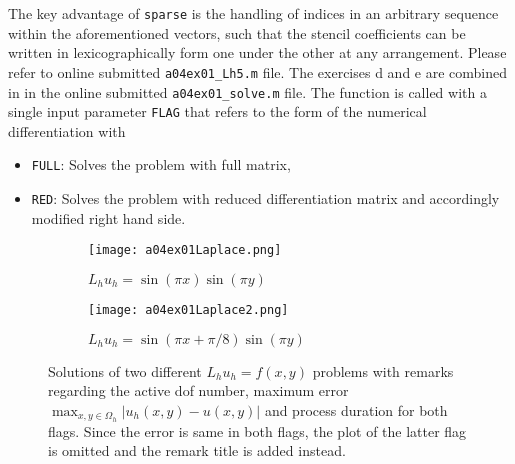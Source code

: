 The key advantage of \texttt{sparse} is the handling of indices in an arbitrary sequence within the aforementioned vectors, such that the stencil coefficients can be written in lexicographically form one under the other at any arrangement.
%
Please refer to online submitted \texttt{a04ex01\_Lh5.m} file.
%
The exercises d and e are combined in in the online submitted \texttt{a04ex01\_solve.m} file.
The function is called with a single input parameter \texttt{FLAG} that refers to the form of the numerical differentiation with
\begin{itemize}
	\item \texttt{FULL}: Solves the problem with full matrix,
	\item \texttt{RED}: Solves the problem with reduced differentiation matrix and accordingly modified right hand side.
\end{itemize}

\begin{figure}[p]
\vspace*{\FigUpperVSpace}
	\begin{subfigure}[t]{0.9\hsize}
		\centering
		\texttt{[image: a04ex01Laplace.png]} 
		\caption{$L_h u_h = \sin{(\pi x)} \sin{(\pi y)} $}
		\label{fig:a04ex01Laplace1}
		\vspace*{8mm}
	\end{subfigure}
\par\bigskip %
	\begin{subfigure}[b]{0.9\hsize}
		\centering
		\texttt{[image: a04ex01Laplace2.png]} 
		\caption{$L_h u_h = \sin{(\pi x + \pi/8)} \sin{(\pi y)} $}
		\label{fig:a04ex01Laplace2}
		\vspace*{5mm}
	\end{subfigure}
	\caption{Solutions of two different $L_h u_h = f(x,y)$ problems with remarks regarding the active dof number, maximum error $\max_{x,y \in \Omega_h} |u_h (x,y) - u(x,y)|$ and process duration for both flags. Since the error is same in both flags, the plot of the latter flag is omitted and the remark title is added instead.}
	\label{fig:a04ex01Laplace}
\end{figure}

